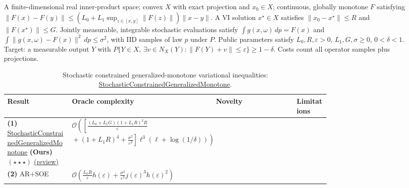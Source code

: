 \begin{table}[tp]
\centering
\caption{Stochastic constrained generalized-monotone variational inequalities: \href{https://github.com/k3nfalt/longtails/blob/main/LongTails/Setups/StochasticConstrainedGeneralizedMonotone.lean}{StochasticConstrainedGeneralizedMonotone}.}\label{tab:StochasticConstrainedGeneralizedMonotone}
\parbox{\linewidth}{\footnotesize A finite-dimensional real inner-product space; convex $X$ with exact projection and $x_0\in X$; continuous, globally monotone $F$ satisfying $\|F(x)-F(y)\|\le (L_0+L_1\sup_{z\in[x,y]}\|F(z)\|)\|x-y\|$. A VI solution $x^\star\in X$ satisfies $\|x_0-x^\star\|\le R$ and $\|F(x^\star)\|\le G$. Jointly measurable, integrable stochastic evaluations satisfy $\int g(x,\omega)\,dp=F(x)$ and $\int\|g(x,\omega)-F(x)\|^2\,dp\le\sigma^2$, with IID samples of law $p$ under $P$. Public parameters satisfy $L_0,R,\varepsilon>0$, $L_1,G,\sigma\ge0$, $0<\delta<1$. Target: a measurable output $Y$ with $P\{Y\in X,\ \exists v\in N_X(Y):\|F(Y)+v\|\le\varepsilon\}\ge1-\delta$. Costs count all operator samples plus projections.}\par\smallskip
\begin{threeparttable}
\footnotesize
\setlength{\tabcolsep}{4pt}\renewcommand{\arraystretch}{1.25}
\begin{tabularx}{\linewidth}{@{}>{\raggedright\arraybackslash}p{0.20\linewidth}>{\raggedright\arraybackslash}p{0.32\linewidth}>{\raggedright\arraybackslash}p{0.25\linewidth}>{\raggedright\arraybackslash}X@{}}
\toprule
\textbf{Result} & \textbf{Oracle complexity} & \textbf{Novelty} & \textbf{Limitations} \\
\midrule
\textbf{(1)} \href{https://github.com/k3nfalt/longtails/blob/main/LongTails/Theorems/StochasticConstrainedGeneralizedMonotone.lean}{Stochastic\allowbreak Constrained\allowbreak Generalized\allowbreak Monotone} \textbf{(Ours)} $(\star\star\star)$ \href{https://github.com/k3nfalt/longtails/blob/main/scripts/reviews/StochasticConstrainedGeneralizedMonotone.md}{(review)}
& $\mathcal{O}\!\left(\left[\frac{(L_0+L_1G)(1+L_1R)^2R}{\varepsilon}\right.\right.$\newline
$\left.\left.{}+(1+L_1R)^4+\frac{\sigma^2}{\varepsilon^2}\right]\ell^3(\ell+\log(1/\delta))\right)$ & & \\
\midrule[1.2pt]
\textbf{(2)} AR+SOE \citep[Thm.~2.2]{sciJiLanZhu2026v2}
& $\mathcal{O}\!\left(\frac{L_0R}{\varepsilon}h(\varepsilon)+\frac{\sigma^2}{\varepsilon^2}j(\varepsilon)^3h(\varepsilon)^2\right)$\newline

\end{tabularx}
\end{threeparttable}
\end{table}
